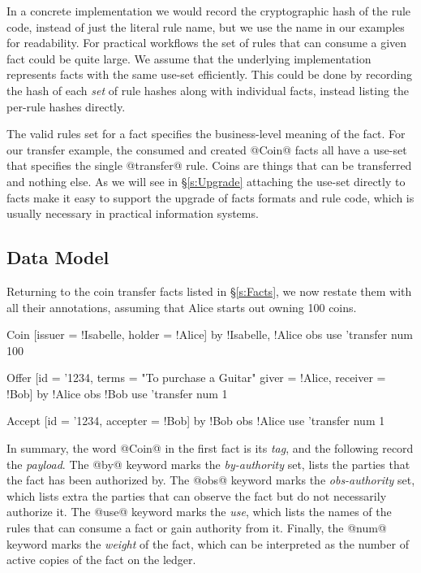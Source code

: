In a concrete implementation we would record the cryptographic hash of the rule code, instead of just the literal rule name, but we use the name in our examples for readability. For practical workflows the set of rules that can consume a given fact could be quite large. We assume that the underlying implementation represents facts with the same use-set efficiently. This could be done by recording the hash of each \emph{set} of rule hashes along with individual facts, instead listing the per-rule hashes directly.

The valid rules set for a fact specifies the business-level meaning of the fact. For our transfer example, the consumed and created @Coin@ facts all have a use-set that specifies the single @transfer@ rule. Coins are things that can be transferred and nothing else. As we will see in \S\ref{s:Upgrade} attaching the use-set directly to facts make it easy to support the upgrade of facts formats and rule code, which is usually necessary in practical information systems.


\subsection{Data Model}
\label{s:NowWithMetadata}
\label{s:DataModel}
Returning to the coin transfer facts listed in \S\ref{s:Facts}, we now restate them with all their annotations, assuming that Alice starts out owning 100 coins.
\begin{small}
\begin{code}
 Coin   [issuer = !Isabelle, holder  = !Alice]
    by  {!Isabelle, !Alice}  obs {}
    use {'transfer}          num 100

 Offer  [id = '1234, terms = "To purchase a Guitar"
         giver = !Alice, receiver = !Bob]
    by  {!Alice}             obs {!Bob}
    use {'transfer}          num 1

 Accept [id = '1234, accepter = !Bob]
    by  {!Bob}               obs {!Alice}
    use {'transfer}          num 1
\end{code}
\end{small}
In summary, the word @Coin@ in the first fact is its \emph{tag}, and the following record the \emph{payload}. The @by@ keyword marks the \emph{by-authority} set, lists the parties that the fact has been authorized by. The @obs@ keyword marks the \emph{obs-authority} set, which lists extra the parties that can observe the fact but do not necessarily authorize it. The @use@ keyword marks the \emph{use}, which lists the names of the rules that can consume a fact or gain authority from it. Finally, the @num@ keyword marks the \emph{weight} of the fact, which can be interpreted as the number of active copies of the fact on the ledger.

